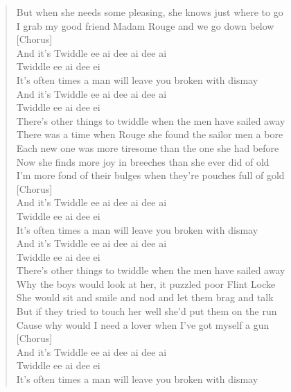 \documentclass[11pt]{article}
\begin{document}
\begin{verse}
But when she needs some pleasing, she knows just where to go\\
I grab my good friend Madam Rouge and we go down below\\
\vspace*{1em}
[Chorus]\\
And it’s Twiddle ee ai dee ai dee ai\\
Twiddle ee ai dee ei\\
It's often times a man will leave you broken with dismay\\
And it's Twiddle ee ai dee ai dee ai\\
Twiddle ee ai dee ei\\
There's other things to twiddle when the men have sailed away\\
There was a time when Rouge she found the sailor men a bore\\
Each new one was more tiresome than the one she had before\\
Now she finds more joy in breeches than she ever did of old\\
I’m more fond of their bulges when they're pouches full of gold\\
\vspace*{1em}
[Chorus]\\
And it's Twiddle ee ai dee ai dee ai\\
Twiddle ee ai dee ei\\
It's often times a man will leave you broken with dismay\\
And it's Twiddle ee ai dee ai dee ai\\
Twiddle ee ai dee ei\\
There's other things to twiddle when the men have sailed away\\
\vspace*{1em}
Why the boys would look at her, it puzzled poor Flint Locke\\
She would sit and smile and nod and let them brag and talk\\
But if they tried to touch her well she'd put them on the run\\
Cause why would I need a lover when I've got myself a gun\\
\vspace*{1em}
[Chorus]\\
And it's Twiddle ee ai dee ai dee ai\\
Twiddle ee ai dee ei\\
It's often times a man will leave you broken with dismay\\

\end{verse}
\end{document}
